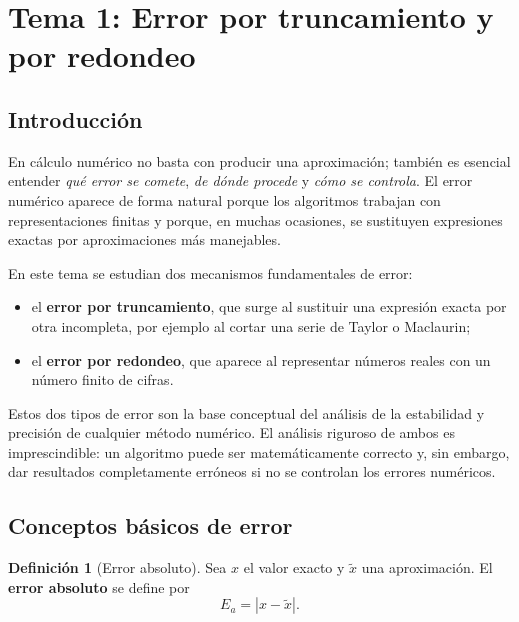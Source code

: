 \documentclass[a4paper,12pt]{article}
\theoremstyle{definition}
\newtheorem{definicion}{Definición}[section]
\theoremstyle{plain}
\begin{document}
\tableofcontents
\newpage

\section{Tema 1: Error por truncamiento y por redondeo}

\subsection{Introducción}

En cálculo numérico no basta con producir una aproximación; también es esencial
entender \emph{qué error se comete}, \emph{de dónde procede} y
\emph{cómo se controla}. El error numérico aparece de forma natural porque los
algoritmos trabajan con representaciones finitas y porque, en muchas ocasiones,
se sustituyen expresiones exactas por aproximaciones más manejables.

En este tema se estudian dos mecanismos fundamentales de error:

\begin{itemize}[leftmargin=1.5em]
    \item el \textbf{error por truncamiento}, que surge al sustituir una expresión
          exacta por otra incompleta, por ejemplo al cortar una serie de Taylor o
          Maclaurin;
    \item el \textbf{error por redondeo}, que aparece al representar números reales
          con un número finito de cifras.
\end{itemize}

Estos dos tipos de error son la base conceptual del análisis de la estabilidad y
precisión de cualquier método numérico. El análisis riguroso de ambos es
imprescindible: un algoritmo puede ser matemáticamente correcto y, sin embargo,
dar resultados completamente erróneos si no se controlan los errores numéricos.

\subsection{Conceptos básicos de error}

\begin{definicion}[Error absoluto]
Sea $x$ el valor exacto y $\tilde{x}$ una aproximación. El \textbf{error absoluto}
se define por
\[
    E_a = |x - \tilde{x}|.
\]
\end{definicion}
\end{document}

